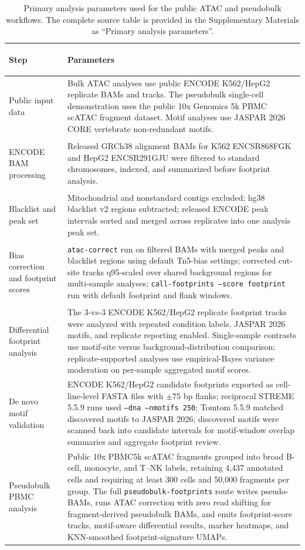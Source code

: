 \documentclass[biomedinformatics,article,submit,pdftex,moreauthors]{Definitions/mdpi}
\begin{document}
\begin{table}[H]
\caption{Primary analysis parameters used for the public ATAC and pseudobulk workflows. The complete source table is provided in the Supplementary Materials as ``Primary analysis parameters''.\label{tab:supp_analysis_parameters}}
\begingroup
\scriptsize
\renewcommand{\arraystretch}{1.04}
\begin{tabularx}{\textwidth}{>{\bfseries\raggedright\arraybackslash}p{}>{\raggedright\arraybackslash}X}
\toprule
\textbf{Step} & \textbf{Parameters}\\
\midrule
Public input data & Bulk ATAC analyses use public ENCODE K562/HepG2 replicate BAMs and tracks. The pseudobulk single-cell demonstration uses the public 10x Genomics 5k PBMC scATAC fragment dataset. Motif analyses use JASPAR 2026 CORE vertebrate non-redundant motifs.\\
ENCODE BAM processing & Released GRCh38 alignment BAMs for K562 ENCSR868FGK and HepG2 ENCSR291GJU were filtered to standard chromosomes, indexed, and summarized before footprint analysis.\\
Blacklist and peak set & Mitochondrial and nonstandard contigs excluded; hg38 blacklist v2 regions subtracted; released ENCODE peak intervals sorted and merged across replicates into one analysis peak set.\\
Bias correction and footprint scores & \texttt{atac-correct} run on filtered BAMs with merged peaks and blacklist regions using default Tn5-bias settings; corrected cut-site tracks q95-scaled over shared background regions for multi-sample analyses; \texttt{call-footprints --score footprint} run with default footprint and flank windows.\\
Differential footprint analysis & The 3-vs-3 ENCODE K562/HepG2 replicate footprint tracks were analyzed with repeated condition labels, JASPAR 2026 motifs, and replicate reporting enabled. Single-sample contrasts use motif-site versus background-distribution comparison; replicate-supported analyses use empirical-Bayes variance moderation on per-sample aggregated motif scores.\\
De novo motif validation & ENCODE K562/HepG2 candidate footprints exported as cell-line-level FASTA files with \(\pm 75\) bp flanks; reciprocal STREME 5.5.9 runs used \texttt{--dna --nmotifs 250}; Tomtom 5.5.9 matched discovered motifs to JASPAR 2026; discovered motifs were scanned back into candidate intervals for motif-window overlap summaries and aggregate footprint review.\\
Pseudobulk PBMC analysis & Public 10x PBMC5k scATAC fragments grouped into broad B-cell, monocyte, and T--NK labels, retaining 4,437 annotated cells and requiring at least 300 cells and 50,000 fragments per group. The full \texttt{pseudobulk-footprints} route writes pseudo-BAMs, runs ATAC correction with zero read shifting for fragment-derived pseudobulk BAMs, and emits footprint-score tracks, motif-aware differential results, marker heatmaps, and KNN-smoothed footprint-signature UMAPs.\\
\bottomrule
\end{tabularx}
\endgroup
\end{table}
\end{document}

